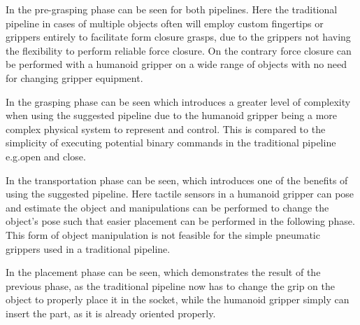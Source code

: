 In  the pre-grasping phase can be seen for both pipelines. Here the traditional pipeline in cases of multiple objects often will employ custom fingertips or grippers entirely to facilitate form closure grasps, due to the grippers not having the flexibility to perform reliable force closure. On the contrary force closure can be performed with a humanoid gripper on a wide range of objects with no need for changing gripper equipment. \medskip

In  the grasping phase can be seen which introduces a greater level of complexity when using the suggested pipeline due to the humanoid gripper being a more complex physical system to represent and control. This is compared to the simplicity of executing potential binary commands in the traditional pipeline e.g.open and close. \medskip

In  the transportation phase can be seen, which introduces one of the benefits of using the suggested pipeline. Here tactile sensors in a humanoid gripper can pose and estimate the object and manipulations can be performed to change the object's pose such that easier placement can be performed in the following phase. This form of object manipulation is not feasible for the simple pneumatic grippers used in a traditional pipeline. \medskip

In  the placement phase can be seen, which demonstrates the result of the previous phase, as the traditional pipeline now has to change the grip on the object to properly place it in the socket, while the humanoid gripper simply can insert the part, as it is already oriented properly. \medskip

\newpage

